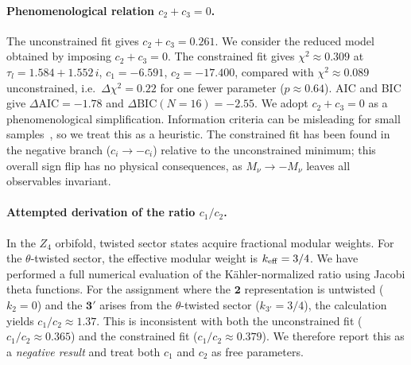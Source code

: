 \documentclass[12pt,a4paper]{article}
\numberwithin{equation}{section}
\begin{document}
\paragraph{Phenomenological relation \(c_2 + c_3 = 0\).}
The unconstrained fit gives \(c_2 + c_3 = 0.261\). We consider the reduced model obtained by imposing \(c_2 + c_3 = 0\). The constrained fit gives \(\chi^2 \approx 0.309\) at \(\tau_l = 1.584 + 1.552\,i\), \(c_1 = -6.591\), \(c_2 = -17.400\), compared with \(\chi^2 \approx 0.089\) unconstrained, i.e.\ \(\Delta\chi^2 = 0.22\) for one fewer parameter (\(p \approx 0.64\)). AIC and BIC give \(\Delta\mathrm{AIC} = -1.78\) and \(\Delta\mathrm{BIC}(N{=}16) = -2.55\). We adopt \(c_2 + c_3 = 0\) as a phenomenological simplification. Information criteria can be misleading for small samples~\cite{Liddle2007}, so we treat this as a heuristic. The constrained fit has been found in the negative branch (\(c_i \to -c_i\)) relative to the unconstrained minimum; this overall sign flip has no physical consequences, as \(M_\nu \to -M_\nu\) leaves all observables invariant.

\paragraph{Attempted derivation of the ratio \(c_1/c_2\).}
In the \(Z_4\) orbifold, twisted sector states acquire fractional modular weights. For the \(\theta\)-twisted sector, the effective modular weight is \(k_{\rm eff} = 3/4\). We have performed a full numerical evaluation of the Kähler-normalized ratio using Jacobi theta functions. For the assignment where the \(\mathbf{2}\) representation is untwisted (\(k_2 = 0\)) and the \(\mathbf{3}'\) arises from the \(\theta\)-twisted sector (\(k_{3'} = 3/4\)), the calculation yields \(c_1/c_2 \approx 1.37\). This is inconsistent with both the unconstrained fit (\(c_1/c_2 \approx 0.365\)) and the constrained fit (\(c_1/c_2 \approx 0.379\)). We therefore report this as a \emph{negative result} and treat both \(c_1\) and \(c_2\) as free parameters.
\end{document}
